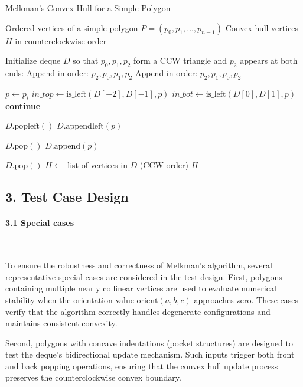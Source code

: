 \documentclass{article}
\begin{document}
\begin{algorithm}[H]
\caption{Melkman’s Convex Hull for a Simple Polygon}
\begin{algorithmic}[1]
\Require Ordered vertices of a simple polygon $P = (p_0, p_1, \dots, p_{n-1})$
\Ensure Convex hull vertices $H$ in counterclockwise order

\State Initialize deque $D$ so that $p_0, p_1, p_2$ form a CCW triangle and $p_2$ appears at both ends:
    \State Append in order: $p_2, p_0, p_1, p_2$
\Else
    \State Append in order: $p_2, p_1, p_0, p_2$
\EndIf

    \State $p \gets p_i$
    \State $in\_top \gets \text{is\_left}(D[-2], D[-1], p)$
    \State $in\_bot \gets \text{is\_left}(D[0], D[1], p)$
        \State \textbf{continue} 
    \EndIf

        \State $D.\text{popleft}()$
    \EndWhile
    \State $D.\text{appendleft}(p)$

        \State $D.\text{pop}()$
    \EndWhile
    \State $D.\text{append}(p)$
\EndFor

\State $D.\text{pop}()$ 
\State $H \gets$ list of vertices in $D$ (CCW order)
\State \Return $H$
\end{algorithmic}
\end{algorithm}

\subsection*{3. Test Case Design}

\paragraph{3.1 Special cases}\

To ensure the robustness and correctness of Melkman’s algorithm, several representative special cases are considered in the test design. 
First, polygons containing multiple nearly collinear vertices are used to evaluate numerical stability when the orientation value $\text{orient}(a,b,c)$ approaches zero. 
These cases verify that the algorithm correctly handles degenerate configurations and maintains consistent convexity. 

Second, polygons with concave indentations (pocket structures) are designed to test the deque’s bidirectional update mechanism. 
Such inputs trigger both front and back popping operations, ensuring that the convex hull update process preserves the counterclockwise convex boundary.
\end{document}
